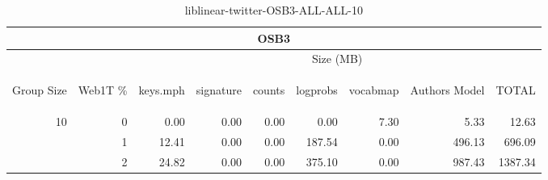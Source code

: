 \begin{center}
\begin{table}[htbp] 
 \begin{center}
\begin{tabular}{ | r | r | r | r | r | r | r | r | r |}
\hline
\multicolumn{9}{|c|}{OSB3}\\
\hline
 & & \multicolumn{7}{|c|}{Size (MB)}\\ \cline{3-9}
\begin{sideways}Group Size\end{sideways} & \begin{sideways}Web1T \% \end{sideways} & \begin{sideways}keys.mph\end{sideways} & \begin{sideways}signature\end{sideways} & \begin{sideways}counts\end{sideways} & \begin{sideways}logprobs\end{sideways} & \begin{sideways}vocabmap\end{sideways} & \begin{sideways}Authors Model \end{sideways} & \begin{sideways}TOTAL\end{sideways}\\
\hline
\multirow{2}{*}{10}
 & 0 & 0.00 & 0.00 & 0.00 & 0.00 & 7.30 & 5.33 & 12.63\\ \cline{2-9}
 & 1 & 12.41 & 0.00 & 0.00 & 187.54 & 0.00 & 496.13 & 696.09\\ \cline{2-9}
 & 2 & 24.82 & 0.00 & 0.00 & 375.10 & 0.00 & 987.43 & 1387.34\\ \cline{2-9}
\hline
\end{tabular}
\caption{liblinear-twitter-OSB3-ALL-ALL-10}
\label{table:liblinear-twitter-OSB3-ALL-ALL-10}
\end{center}
 \end{table}
\end{center}

